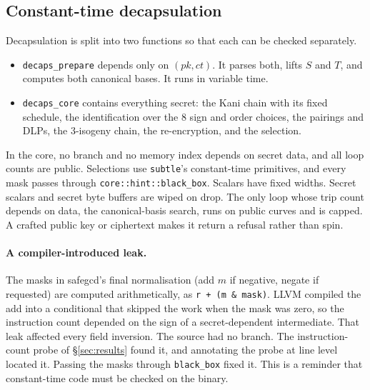 \subsection{Constant-time decapsulation}
Decapsulation is split into two functions so that each can be checked
separately.
\begin{itemize}
\item \texttt{decaps\_prepare} depends only on $(\mathit{pk},\mathit{ct})$.
  It parses both, lifts $S$ and $T$, and computes both canonical bases. It
  runs in variable time.
\item \texttt{decaps\_core} contains everything secret: the Kani chain with
  its fixed schedule, the identification over the 8 sign and order choices,
  the pairings and DLPs, the 3-isogeny chain, the re-encryption, and the
  selection.
\end{itemize}
In the core, no branch and no memory index depends on secret data, and all
loop counts are public. Selections use \texttt{subtle}'s constant-time
primitives, and every mask passes through \texttt{core::hint::black\_box}.
Scalars have fixed widths. Secret scalars and secret byte buffers are wiped on
drop. The only loop whose trip count depends on data, the canonical-basis
search, runs on public curves and is capped. A crafted public key or
ciphertext makes it return a refusal rather than spin.

\paragraph{A compiler-introduced leak.} The masks in safegcd's final
normalisation (add $m$ if negative, negate if requested) are computed
arithmetically, as \texttt{r + (m \& mask)}. LLVM compiled the add into a
conditional that skipped the work when the mask was zero, so the instruction
count depended on the sign of a secret-dependent intermediate. That leak
affected every field inversion. The source had no branch. The
instruction-count probe of \S\ref{sec:results} found it, and annotating the
probe at line level located it. Passing the masks through
\texttt{black\_box} fixed it. This is a reminder that constant-time code must
be checked on the binary.

